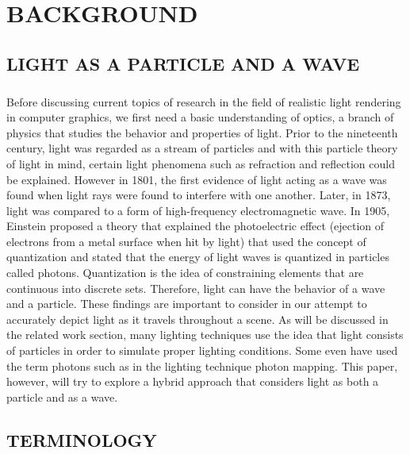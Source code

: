 \chapter{BACKGROUND}

\section{LIGHT AS A PARTICLE AND A WAVE}
\paragraph{}
Before discussing current topics of research in the field of realistic light rendering in computer graphics, we first need a basic understanding of optics, a branch of physics that studies the behavior and properties of light.  Prior to the nineteenth century, light was regarded as a stream of particles and with this particle theory of light in mind, certain light phenomena such as refraction and reflection could be explained.  However in 1801, the first evidence of light acting as a wave was found when light rays were found to interfere with one another.  Later, in 1873, light was compared to a form of high-frequency electromagnetic wave.  In 1905, Einstein proposed a theory that explained the photoelectric effect (ejection of electrons from a metal surface when hit by light) that used the concept of quantization and stated that the energy of light waves is quantized in particles called photons. Quantization is the idea of constraining elements that are continuous into discrete sets. \cite{Serway2004}  Therefore, light can have the behavior of a wave and a particle.  These findings are important to consider in our attempt to accurately depict light as it travels throughout a scene.  As will be discussed in the related work section, many lighting techniques use the idea that light consists of particles in order to simulate proper lighting conditions.  Some even have used the term photons such as in the lighting technique photon mapping.  This paper, however, will try to explore a hybrid approach that considers light as both a particle and as a wave.

\section{TERMINOLOGY}
